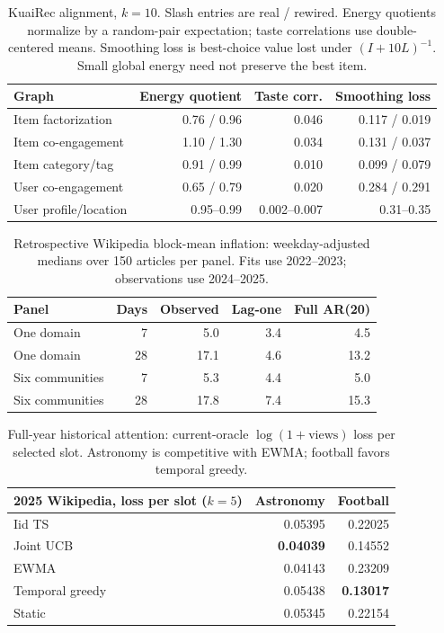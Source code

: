 \documentclass[sigconf,review,anonymous]{acmart}
\begin{document}
\begin{table}[t]\centering\small
\setlength{\tabcolsep}{2.5pt}
\begin{tabular}{lrrr}
\toprule
Graph & Energy quotient & Taste corr. & Smoothing loss \\
\midrule
Item factorization & 0.76 / 0.96 & 0.046 & 0.117 / 0.019 \\
Item co-engagement & 1.10 / 1.30 & 0.034 & 0.131 / 0.037 \\
Item category/tag & 0.91 / 0.99 & 0.010 & 0.099 / 0.079 \\
User co-engagement & 0.65 / 0.79 & 0.020 & 0.284 / 0.291 \\
User profile/location & 0.95--0.99 & 0.002--0.007 & 0.31--0.35 \\
\bottomrule
\end{tabular}
\caption{KuaiRec alignment, $k=10$. Slash entries are real / rewired. Energy quotients normalize by a random-pair expectation; taste correlations use double-centered means. Smoothing loss is best-choice value lost under $(I+10L)^{-1}$. Small global energy need not preserve the best item.}\label{tab:align}
\end{table}

\begin{table}[t]\centering\small
\setlength{\tabcolsep}{3pt}
\begin{tabular}{lrrrr}
\toprule
Panel & Days & Observed & Lag-one & Full AR(20) \\
\midrule
One domain & 7 & 5.0 & 3.4 & 4.5 \\
One domain & 28 & 17.1 & 4.6 & 13.2 \\
Six communities & 7 & 5.3 & 4.4 & 5.0 \\
Six communities & 28 & 17.8 & 7.4 & 15.3 \\
\bottomrule
\end{tabular}
\caption{Retrospective Wikipedia block-mean inflation: weekday-adjusted medians over 150 articles per panel. Fits use 2022--2023; observations use 2024--2025.}\label{tab:inflation}
\end{table}

\begin{table}[t]\centering\small
\setlength{\tabcolsep}{3pt}
\begin{tabular}{lrr}
\toprule
2025 Wikipedia, loss per slot ($k=5$) & Astronomy & Football \\
\midrule
Iid TS & 0.05395 & 0.22025 \\
Joint UCB & \textbf{0.04039} & 0.14552 \\
EWMA & 0.04143 & 0.23209 \\
Temporal greedy & 0.05438 & \textbf{0.13017} \\
Static & 0.05345 & 0.22154 \\
\bottomrule
\end{tabular}
\caption{Full-year historical attention: current-oracle $\log(1+\mathrm{views})$ loss per selected slot. Astronomy is competitive with EWMA; football favors temporal greedy.}\label{tab:wiki}
\end{table}
\end{document}
